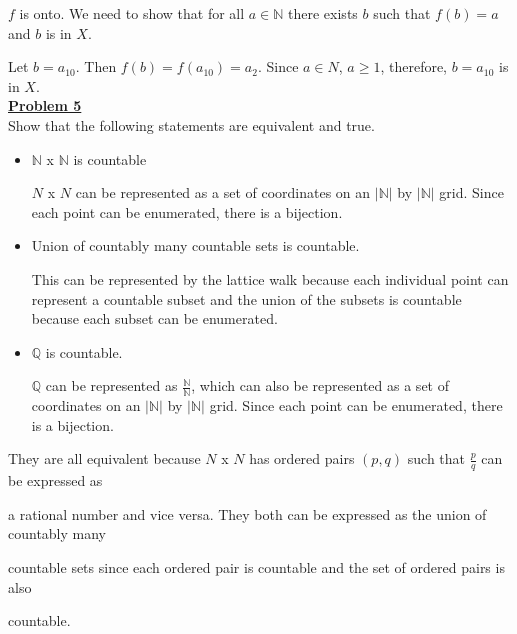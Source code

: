\documentclass[11pt]{article}
\begin{document}
	$f$ is onto. We need to show that for all $a \in \mathbb{N}$ there exists $b$ such that $f(b)=a$ and $b$ is in $X$. 

	Let $b = a_{10}$. Then $f(b) = f(a_{10}) = a_2$. Since $a \in N$, $a \ge 1$, therefore, $b = a_{10}$ is in $X$.\\

\noindent\textbf{\underline{Problem 5}}\\
	Show that the following statements are equivalent and true. \\
	\begin{itemize}
		\item $\mathbb{N}$ x $\mathbb{N}$ is countable

			$N$ x $N$ can be represented as a set of coordinates on an $|\mathbb{N}|$ by $|\mathbb{N}|$ grid. Since each point can be enumerated, there is a bijection.

		\item Union of countably many countable sets is countable.
			
			This can be represented by the lattice walk because each individual point can represent a countable subset and the union of the subsets is countable because each subset can be enumerated. 

		\item $\mathbb{Q}$ is countable.

			$\mathbb{Q}$ can be represented as $\frac{\mathbb{N}}{\mathbb{N}}$, which can also be represented as a set of coordinates on an $|\mathbb{N}|$ by $|\mathbb{N}|$ grid. Since each point can be enumerated, there is a bijection.
	\end{itemize}

	They are all equivalent because $N$ x $N$ has ordered pairs $(p,q)$ such that $\frac{p}{q}$ can be expressed as 

	a rational number and vice versa. They both can be expressed as the union of countably many 

	countable sets since each ordered pair is countable and the set of ordered pairs is also 

	countable. 
\end{document}
